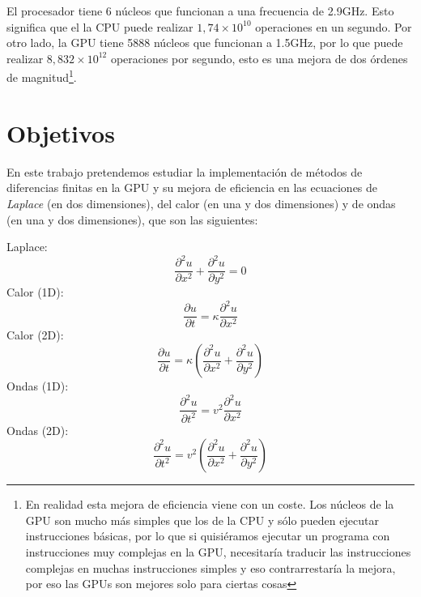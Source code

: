 El procesador tiene 6 núcleos que funcionan a una frecuencia de 2.9GHz. Esto significa que el la \ac{CPU} puede realizar $1,74\times10^{10}$ operaciones en un segundo. Por otro lado, la \ac{GPU} tiene 5888 núcleos que funcionan a 1.5GHz, por lo que puede realizar $8,832\times10^{12}$ operaciones por segundo, esto es una mejora de dos órdenes de magnitud\footnote{En realidad esta mejora de eficiencia viene con un coste. Los núcleos de la \ac{GPU} son mucho más simples que los de la \ac{CPU} y sólo pueden ejecutar instrucciones básicas, por lo que si quisiéramos ejecutar un programa con instrucciones muy complejas en la \ac{GPU}, necesitaría traducir las instrucciones complejas en muchas instrucciones simples y eso contrarrestaría la mejora, por eso las \ac{GPU}s son mejores solo para ciertas cosas}.


\section{Objetivos}
En este trabajo pretendemos estudiar la implementación de métodos de diferencias finitas en la \ac{GPU} y su mejora de eficiencia en las ecuaciones de \emph{Laplace} (en dos dimensiones), del calor (en una y dos dimensiones) y de ondas (en una y dos dimensiones), que son las siguientes:

\begin{multicols}{3}
	\centering
	Laplace:
	\begin{equation}
		\frac{\partial^2u}{\partial x^2}+\frac{\partial^2u}{\partial y^2}=0
	\end{equation}
	Calor (1D):
	\begin{equation}
		\frac{\partial u}{\partial t} = \kappa\frac{\partial ^2u}{\partial x^2} 
	\end{equation}
Calor (2D):
	\begin{equation}
		\frac{\partial u}{\partial t}=\kappa\left(\frac{\partial^2u}{\partial x^2}+\frac{\partial^2u}{\partial y^2}\right)
	\end{equation}
Ondas (1D):
	\begin{equation}
		\frac{\partial^2u}{\partial t^2}=v^2\frac{\partial^2u}{\partial x^2}
	\end{equation}
Ondas (2D):
	\begin{equation}
		\frac{\partial^2u}{\partial t^2}=v^2\left(\frac{\partial^2u}{\partial x^2}+\frac{\partial^2u}{\partial y^2}\right)
	\end{equation}
\end{multicols}

